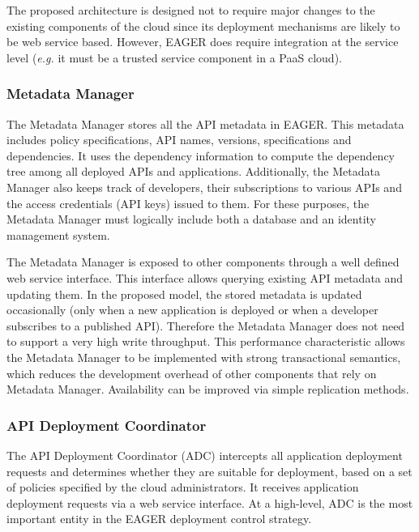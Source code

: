 The proposed architecture is designed not to require major changes to the 
existing components of the cloud since its deployment mechanisms are likely to
be web service based.  However, EAGER does require integration at the service level
({\em e.g.} it must be a trusted service component in a PaaS cloud). 

\subsubsection{Metadata Manager}
The Metadata Manager stores all the API metadata in EAGER. This metadata 
includes policy specifications,  API names, versions, specifications and 
dependencies.
It uses the dependency information to compute the dependency tree 
among 
all deployed APIs and applications. Additionally, the Metadata Manager
also keeps track of developers, their subscriptions to various APIs and the access credentials (API keys) issued to them. 
For these purposes,
the Metadata Manager must logically include both a database
and an identity management system.

The Metadata Manager is exposed to other components through a well defined web service interface.
This interface allows querying existing API metadata and updating them. In the proposed model, the stored metadata is updated 
occasionally (only when a new application is deployed or when a developer subscribes to a published API). Therefore the Metadata Manager
does not need to support a very high write throughput. This performance
characteristic allows the Metadata Manager to be implemented with strong 
transactional semantics,
which reduces the development overhead of other components that rely on Metadata Manager. Availability can be improved via
simple replication methods.

\subsubsection{API Deployment Coordinator} 
\label{sec:adc}
The API Deployment Coordinator (ADC)
intercepts all application deployment requests and determines whether they are
suitable for deployment, based on a set of policies specified by the cloud
administrators. It receives application deployment requests via a web service
interface. At a high-level, ADC is the most important entity in the EAGER deployment
control strategy.


